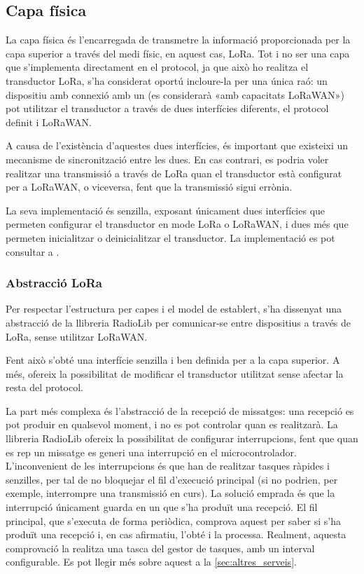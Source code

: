 \documentclass{tfgitic}[2024/07/01]
\begin{document}
\subsection{Capa física}
La capa física és l'encarregada de transmetre la informació proporcionada per la capa superior a través del medi físic, en aquest cas, LoRa. Tot i no ser una capa que s'implementa directament en el protocol, ja que això ho realitza el transductor LoRa, s'ha considerat oportú incloure-la per una única raó: un dispositiu amb connexió amb un  (es considerarà «amb capacitats LoRaWAN») pot utilitzar el transductor a través de dues interfícies diferents, el protocol definit i LoRaWAN.

A causa de l'existència d'aquestes dues interfícies, és important que existeixi un mecanisme de sincronització entre les dues. En cas contrari, es podria voler realitzar una transmissió a través de LoRa quan el transductor està configurat per a LoRaWAN, o viceversa, fent que la transmissió sigui errònia.

La seva implementació és senzilla, exposant únicament dues interfícies que permeten configurar el transductor en mode LoRa o LoRaWAN, i dues més que permeten inicialitzar o deinicialitzar el transductor. La implementació es pot consultar a . 

\subsubsection{Abstracció LoRa}
Per respectar l'estructura per capes i el model de  establert, s'ha dissenyat una abstracció de la llibreria RadioLib per comunicar-se entre dispositius a través de LoRa, sense utilitzar LoRaWAN.

Fent això s'obté una interfície senzilla i ben definida per a la capa superior. A més, ofereix la possibilitat de modificar el transductor utilitzat sense afectar la resta del protocol. 

La part més complexa és l'abstracció de la recepció de missatges: una recepció es pot produir en qualsevol moment, i no es pot controlar quan es realitzarà. La llibreria RadioLib ofereix la possibilitat de configurar interrupcions, fent que quan es rep un missatge es generi una interrupció en el microcontrolador. L'inconvenient de les interrupcions és que han de realitzar tasques ràpides i senzilles, per tal de no bloquejar el fil d'execució principal (si no podrien, per exemple, interrompre una transmissió en curs). La solució emprada és que la interrupció únicament guarda en un  que s'ha produït una recepció. El fil principal, que s'executa de forma periòdica, comprova aquest  per saber si s'ha produït una recepció i, en cas afirmatiu, l'obté i la processa. Realment, aquesta comprovació la realitza una tasca del gestor de tasques, amb un interval configurable. Es pot llegir més sobre aquest a la \autoref{sec:altres_serveis}.
\end{document}
